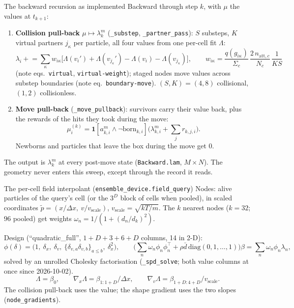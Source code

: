 \documentclass[10pt,aspectratio=169]{beamer}
\newcommand{\ind}{\mathbf{1}}
\newcommand{\code}[1]{\texttt{\small #1}}
\newcommand{\Lam}{\Lambda}
\begin{document}
\begin{frame}{The backward recursion as implemented}
Backward through step $k$, with $\mu$ the values at $t_{k+1}$:
\begin{enumerate}
\item \textbf{Collision pull-back} $\mu \mapsto \lambda^m_k$ (\code{\_substep}, \code{\_partner\_pass}):
$S$ substeps, $K$ virtual partners $j_\kappa$ per particle, all four values from one per-cell
fit $\Lam$:
\[
\lambda_i \mathrel{+}= \sum_\kappa w_{i\kappa}\big[\Lam(v_i') + \Lam(v_{j_\kappa}') - \Lam(v_i) - \Lam(v_{j_\kappa})\big],
\qquad
w_{i\kappa} = \frac{q(g_{i\kappa})}{\Sigma_c}\,\frac{2\,n_{\mathrm{att},c}}{N_c}\,\frac{1}{KS}
\]
(note eqs.\ \code{virtual}, \code{virtual-weight}); staged nodes move values across substep boundaries (note eq.\ \code{boundary-move}).
$(S,K) = (4,8)$ collisional, $(1,2)$ collisionless.
\item \textbf{Move pull-back} (\code{\_move\_pullback}): survivors carry their value back,
plus the rewards of the hits they took during the move:
\[
\mu^{(k)}_i = \ind[a^m_{k,i}\wedge \neg\mathrm{born}_{k,i}]\Big(\lambda^m_{k,i} + \sum_j r_{k,j,i}\Big).
\]
Newborns and particles that leave the box during the move get $0$.
\end{enumerate}
The output is $\lambda^m_k$ at every post-move state (\code{Backward.lam}, $M\times N$).  The
geometry never enters this sweep, except through the record it reads.
\end{frame}

\begin{frame}{The per-cell field interpolant (\code{ensemble\_device.field\_query})}
Nodes: alive particles of the query's cell (or the $3^D$ block of cells when pooled), in
scaled coordinates $\tilde p = (x/\Delta x,\ v/v_{\mathrm{scale}})$, $v_{\mathrm{scale}} = \sqrt{kT/m}$.
The $k$ nearest nodes ($k = 32$; $96$ pooled) get weights $\omega_n = 1/(1 + (d_n/d_k)^2)$.

\medskip
Design (``quadratic\_full'', $1 + D + 3 + 6 + D$ columns, 14 in 2-D):
\[
\phi(\delta) = \big(1,\ \delta_x,\ \delta_v,\ \{\delta_{v,a}\delta_{v,b}\}_{a\le b},\ \delta_x^{2}\big),
\qquad
\Big(\sum_n\omega_n\phi_n\phi_n^\top + \rho\bar d\,\mathrm{diag}(0,1,\dots,1)\Big)\beta
= \sum_n\omega_n\phi_n\lambda_n ,
\]
solved by an unrolled Cholesky factorisation (\code{\_spd\_solve}; both value columns at once since 2026-10-02).
\[
\Lam = \beta_0,\qquad \nabla_x\Lam = \beta_{1:1+D}/\Delta x,\qquad \nabla_v\Lam = \beta_{1+D:4+D}/v_{\mathrm{scale}} .
\]
The collision pull-back uses the value; the shape gradient uses the two slopes
(\code{node\_gradients}).
\end{frame}
\end{document}
